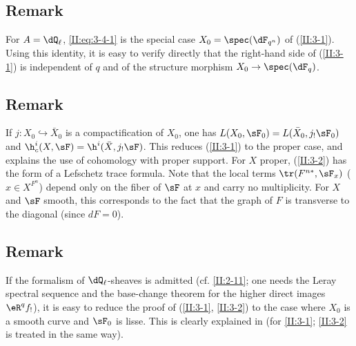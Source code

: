 \subsection{Remark}\label{II:3-5}

For $A=\dQ_\ell$, \eqref{II:eq:3-4-1} is the special case
$X_0=\spec(\dF_{q^n})$ of (\ref{II:3-1}). Using this identity, it is easy to
verify directly that the right-hand side of (\ref{II:3-1}) is independent of
$q$ and of the structure morphism $X_0\to\spec(\dF_q)$.






\subsection{Remark}\label{II:3-6}

If $j:X_0\hookrightarrow \bar X_0$ is a compactification of $X_0$, one has
$L(X_0,\sF_0) = L(\bar X_0, j_!\sF_0)$ and
$\h_c^i(X,\sF) = \h^i(\bar X,j_!\sF)$. This reduces (\ref{II:3-1}) to the
proper case, and explains the use of cohomology with proper support. For $X$
proper, (\ref{II:3-2}) has the form of a Lefschetz trace formula. Note that
the local terms $\tr(F^{n *},\sF_x)$ ($x\in X^{F^n}$) depend only on the
fiber of $\sF$ at $x$ and carry no multiplicity. For $X$ and $\sF$ smooth,
this corresponds to the fact that the graph of $F$ is transverse to the
diagonal (since $d F = 0$).






\subsection{Remark}\label{II:3-7}

If the formalism of $\dQ_\ell$-sheaves is admitted (cf. \ref{II:2-11}; one
needs the Leray spectral sequence and the base-change theorem for the higher
direct images $\eR^q f_!$), it is easy to reduce the proof of
(\ref{II:3-1}, \ref{II:3-2}) to the case where $X_0$ is a smooth curve and
$\sF_0$ is lisse. This is clearly explained in \cite[\S 5]{gr95} (for
\ref{II:3-1}; \ref{II:3-2} is treated in the same way).






\subsection{}\label{II:3-8}

